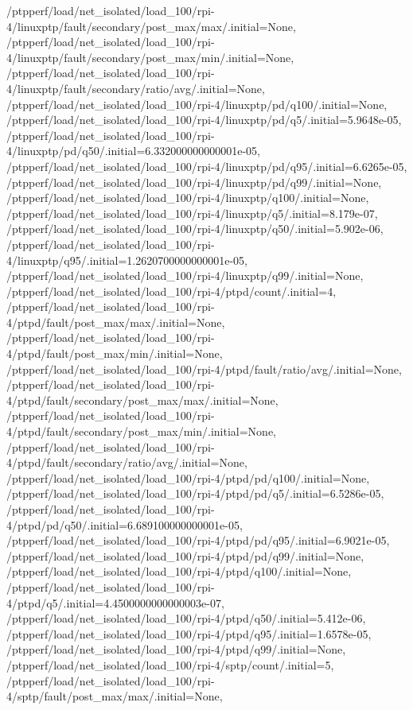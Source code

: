 {    /ptpperf/load/net_isolated/load_100/rpi-4/linuxptp/fault/secondary/post_max/max/.initial=None,
    /ptpperf/load/net_isolated/load_100/rpi-4/linuxptp/fault/secondary/post_max/min/.initial=None,
    /ptpperf/load/net_isolated/load_100/rpi-4/linuxptp/fault/secondary/ratio/avg/.initial=None,
    /ptpperf/load/net_isolated/load_100/rpi-4/linuxptp/pd/q100/.initial=None,
    /ptpperf/load/net_isolated/load_100/rpi-4/linuxptp/pd/q5/.initial=5.9648e-05,
    /ptpperf/load/net_isolated/load_100/rpi-4/linuxptp/pd/q50/.initial=6.332000000000001e-05,
    /ptpperf/load/net_isolated/load_100/rpi-4/linuxptp/pd/q95/.initial=6.6265e-05,
    /ptpperf/load/net_isolated/load_100/rpi-4/linuxptp/pd/q99/.initial=None,
    /ptpperf/load/net_isolated/load_100/rpi-4/linuxptp/q100/.initial=None,
    /ptpperf/load/net_isolated/load_100/rpi-4/linuxptp/q5/.initial=8.179e-07,
    /ptpperf/load/net_isolated/load_100/rpi-4/linuxptp/q50/.initial=5.902e-06,
    /ptpperf/load/net_isolated/load_100/rpi-4/linuxptp/q95/.initial=1.2620700000000001e-05,
    /ptpperf/load/net_isolated/load_100/rpi-4/linuxptp/q99/.initial=None,
    /ptpperf/load/net_isolated/load_100/rpi-4/ptpd/count/.initial=4,
    /ptpperf/load/net_isolated/load_100/rpi-4/ptpd/fault/post_max/max/.initial=None,
    /ptpperf/load/net_isolated/load_100/rpi-4/ptpd/fault/post_max/min/.initial=None,
    /ptpperf/load/net_isolated/load_100/rpi-4/ptpd/fault/ratio/avg/.initial=None,
    /ptpperf/load/net_isolated/load_100/rpi-4/ptpd/fault/secondary/post_max/max/.initial=None,
    /ptpperf/load/net_isolated/load_100/rpi-4/ptpd/fault/secondary/post_max/min/.initial=None,
    /ptpperf/load/net_isolated/load_100/rpi-4/ptpd/fault/secondary/ratio/avg/.initial=None,
    /ptpperf/load/net_isolated/load_100/rpi-4/ptpd/pd/q100/.initial=None,
    /ptpperf/load/net_isolated/load_100/rpi-4/ptpd/pd/q5/.initial=6.5286e-05,
    /ptpperf/load/net_isolated/load_100/rpi-4/ptpd/pd/q50/.initial=6.689100000000001e-05,
    /ptpperf/load/net_isolated/load_100/rpi-4/ptpd/pd/q95/.initial=6.9021e-05,
    /ptpperf/load/net_isolated/load_100/rpi-4/ptpd/pd/q99/.initial=None,
    /ptpperf/load/net_isolated/load_100/rpi-4/ptpd/q100/.initial=None,
    /ptpperf/load/net_isolated/load_100/rpi-4/ptpd/q5/.initial=4.4500000000000003e-07,
    /ptpperf/load/net_isolated/load_100/rpi-4/ptpd/q50/.initial=5.412e-06,
    /ptpperf/load/net_isolated/load_100/rpi-4/ptpd/q95/.initial=1.6578e-05,
    /ptpperf/load/net_isolated/load_100/rpi-4/ptpd/q99/.initial=None,
    /ptpperf/load/net_isolated/load_100/rpi-4/sptp/count/.initial=5,
    /ptpperf/load/net_isolated/load_100/rpi-4/sptp/fault/post_max/max/.initial=None,
}
